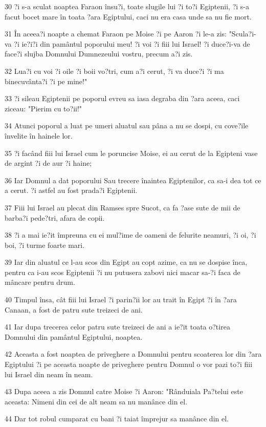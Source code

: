 \par 30 ?i s-a sculat noaptea Faraon însu?i, toate slugile lui ?i to?i Egiptenii, ?i s-a facut bocet mare în toata ?ara Egiptului, caci nu era casa unde sa nu fie mort.
\par 31 În aceea?i noapte a chemat Faraon pe Moise ?i pe Aaron ?i le-a zis: "Scula?i-va ?i ie?i?i din pamântul poporului meu! ?i voi ?i fiii lui Israel! ?i duce?i-va de face?i slujba Domnului Dumnezeului vostru, precum a?i zis.
\par 32 Lua?i cu voi ?i oile ?i boii vo?tri, cum a?i cerut, ?i va duce?i ?i ma binecuvânta?i ?i pe mine!"
\par 33 ?i sileau Egiptenii pe poporul evreu sa iasa degraba din ?ara aceea, caci ziceau: "Pierim cu to?ii!"
\par 34 Atunci poporul a luat pe umeri aluatul sau pâna a nu se dospi, cu cove?ile învelite în hainele lor.
\par 35 ?i facând fiii lui Israel cum le poruncise Moise, ei au cerut de la Egipteni vase de argint ?i de aur ?i haine;
\par 36 Iar Domnul a dat poporului Sau trecere înaintea Egiptenilor, ca sa-i dea tot ce a cerut. ?i astfel au fost prada?i Egiptenii.
\par 37 Fiii lui Israel au plecat din Ramses spre Sucot, ca fa ?ase sute de mii de barba?i pede?tri, afara de copii.
\par 38 ?i a mai ie?it împreuna cu ei mul?ime de oameni de felurite neamuri, ?i oi, ?i boi, ?i turme foarte mari.
\par 39 Iar din aluatul ce l-au scos din Egipt au copt azime, ca nu se dospise înca, pentru ca i-au scos Egiptenii ?i nu putusera zabovi nici macar sa-?i faca de mâncare pentru drum.
\par 40 Timpul însa, cât fiii lui Israel ?i parin?ii lor au trait în Egipt ?i în ?ara Canaan, a fost de patru sute treizeci de ani.
\par 41 Iar dupa trecerea celor patru sute treizeci de ani a ie?it toata o?tirea Domnului din pamântul Egiptului, noaptea.
\par 42 Aceasta a fost noaptea de priveghere a Domnului pentru scoaterea lor din ?ara Egiptului ?i pe aceasta noapte de priveghere pentru Domnul o vor pazi to?i fiii lui Israel din neam în neam.
\par 43 Dupa aceea a zis Domnul catre Moise ?i Aaron: "Rânduiala Pa?telui este aceasta: Nimeni din cei de alt neam sa nu manânce din el.
\par 44 Dar tot robul cumparat cu bani ?i taiat împrejur sa manânce din el.
